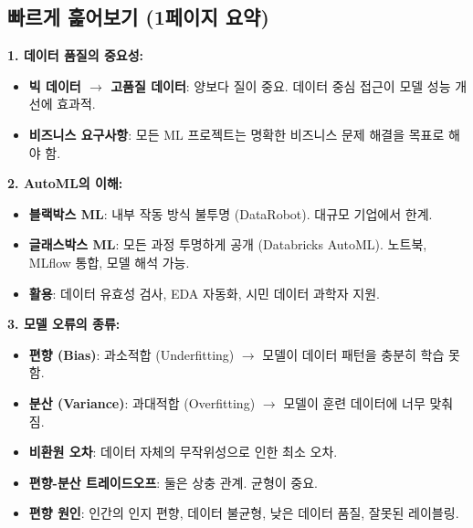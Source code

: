 \documentclass[11pt,a4paper]{article}
\begin{document}
\begin{itemize}
\begin{itemize}
\begin{itemize}
\begin{itemize}
\begin{itemize}
\begin{enumerate}
\newpage
\section*{빠르게 훑어보기 (1페이지 요약)}

\begin{tcolorbox}[colback=myblue!20, colframe=blue!75!black, title=\textbf{CSCI103 Lecture 10 핵심 요약}, sharp corners, boxsep=5mm, left=3mm, right=3mm, top=3mm, bottom=3mm]

\textbf{1. 데이터 품질의 중요성:}
\begin{itemize}
    \item \textbf{빅 데이터 $\rightarrow$ 고품질 데이터}: 양보다 질이 중요. 데이터 중심 접근이 모델 성능 개선에 효과적.
    \item \textbf{비즈니스 요구사항}: 모든 ML 프로젝트는 명확한 비즈니스 문제 해결을 목표로 해야 함.
\end{itemize}

\textbf{2. AutoML의 이해:}
\begin{itemize}
    \item \textbf{블랙박스 ML}: 내부 작동 방식 불투명 (DataRobot). 대규모 기업에서 한계.
    \item \textbf{글래스박스 ML}: 모든 과정 투명하게 공개 (Databricks AutoML). 노트북, MLflow 통합, 모델 해석 가능.
    \item \textbf{활용}: 데이터 유효성 검사, EDA 자동화, 시민 데이터 과학자 지원.
\end{itemize}

\textbf{3. 모델 오류의 종류:}
\begin{itemize}
    \item \textbf{편향 (Bias)}: 과소적합 (Underfitting) $\rightarrow$ 모델이 데이터 패턴을 충분히 학습 못함.
    \item \textbf{분산 (Variance)}: 과대적합 (Overfitting) $\rightarrow$ 모델이 훈련 데이터에 너무 맞춰짐.
    \item \textbf{비환원 오차}: 데이터 자체의 무작위성으로 인한 최소 오차.
    \item \textbf{편향-분산 트레이드오프}: 둘은 상충 관계. 균형이 중요.
    \item \textbf{편향 원인}: 인간의 인지 편향, 데이터 불균형, 낮은 데이터 품질, 잘못된 레이블링.
\end{itemize}


\end{tcolorbox}
\end{enumerate}
\end{itemize}
\end{itemize}
\end{itemize}
\end{itemize}
\end{itemize}
\end{document}
